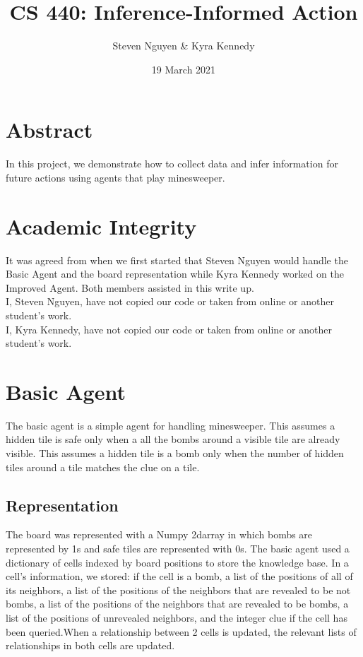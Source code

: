 \documentclass[13pt]{report}
\title{CS 440: Inference-Informed Action}
\author{Steven Nguyen \& Kyra Kennedy}
\date{19 March 2021}
\begin{document}
\begin{titlepage}
\maketitle
\end{titlepage}

\section*{Abstract}
In this project, we demonstrate how to collect data and infer information for future actions using agents that play minesweeper.

\section*{Academic Integrity}
It was agreed from when we first started that Steven Nguyen would handle the Basic Agent and the board representation while Kyra Kennedy worked on the Improved Agent. Both members assisted in this write up.\\
I, Steven Nguyen, have not copied our code or taken from online or another student's work.\\
I, Kyra Kennedy, have not copied our code or taken from online or another student's work.

\break
\section*{Basic Agent}
The basic agent is a simple agent for handling minesweeper. This assumes a hidden tile is safe only when a all the bombs around a visible tile are already visible. This assumes a hidden tile is a bomb only when the number of hidden tiles around a tile matches the clue on a tile.

\subsection*{Representation}
The board was represented with a Numpy 2darray in which bombs are represented by 1s and safe tiles are represented with 0s. The basic agent used a dictionary of cells indexed by board positions to store the knowledge base. In a cell's information, we stored: if the cell is a bomb, a list of the positions of all of its neighbors, a list of the positions of the neighbors that are revealed to be not bombs, a list of the positions of the neighbors that are revealed to be bombs, a list of the positions of unrevealed neighbors, and the integer clue if the cell has been queried.When a relationship between 2 cells is updated, the relevant lists of relationships in both cells are updated.
\end{document}
